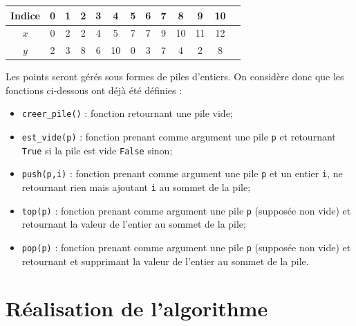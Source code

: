 \documentclass[10pt,fleqn]{article} %
\begin{document}
\begin{center}
\begin{tabular}{|c||c|c|c|c|c|c|c|c|c|c|c|c|}
\hline 
Indice & 0 & 1 & 2 & 3 & 4 & 5 & 6 & 7 & 8 & 9 & 10  \\
\hline\hline
$x$ & 0 & 2 & 2 & 4 & 5 & 7 & 7 & 9 & 10 & 11 & 12 \\
\hline 
$y$ & 2 & 3 & 8 & 6 & 10 & 0 & 3 & 7 & 4 & 2 & 8 \\
\hline
\end{tabular}
\end{center}

Les points seront gérés sous formes de piles d'entiers. On considère donc que les fonctions ci-dessous ont déjà été définies : 
\begin{itemize}
\item \texttt{creer\_pile()} : fonction retournant une pile vide;
\item \texttt{est\_vide(p)} : fonction prenant comme argument une pile \texttt{p} et retournant \texttt{True} si la pile est vide \texttt{False} sinon;
\item \texttt{push(p,i)} : fonction prenant comme argument une pile \texttt{p} et un entier \texttt{i},  ne retournant rien mais ajoutant \texttt{i} au sommet de la pile;
\item \texttt{top(p)} :  fonction prenant comme argument une pile \texttt{p} (supposée non vide) et retournant la valeur de l'entier au sommet de la pile;
\item \texttt{pop(p)} :  fonction prenant comme argument une pile \texttt{p} (supposée non vide) et retournant et supprimant la valeur de l'entier au sommet de la pile.
\end{itemize}

\fi


\section{Réalisation de l'algorithme}
\end{document}
